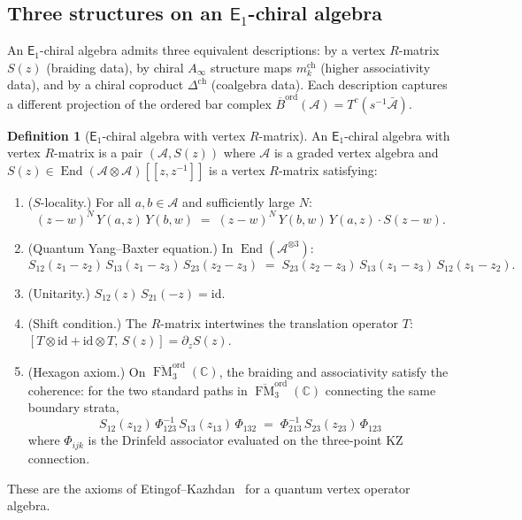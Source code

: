 \documentclass[11pt,reqno]{amsart}
\theoremstyle{definition}
\newtheorem{definition}[theorem]{Definition}
\theoremstyle{remark}
\newcommand{\cA}{\mathcal{A}}
\newcommand{\Ainf}{A_{\infty}}
\newcommand{\Eone}{\mathsf{E}_{1}}
\DeclareMathOperator{\End}{End}
\DeclareMathOperator{\FM}{FM}
\newcommand{\Barord}{\overline{B}^{\mathrm{ord}}}
\newcommand{\CC}{\mathbb{C}}
\newcommand{\id}{\mathrm{id}}
\numberwithin{equation}{section}
\begin{document}
\subsection{Three structures on an $\Eone$-chiral algebra}
\label{subsec:three-structures}

An $\Eone$-chiral algebra admits three equivalent
descriptions: by a vertex $R$-matrix $S(z)$ (braiding data),
by chiral $\Ainf$ structure maps $m_k^{\mathrm{ch}}$
(higher associativity data), and by a chiral coproduct
$\Delta^{\mathrm{ch}}$ (coalgebra data). Each description
captures a different projection of the ordered bar complex
$\Barord(\cA) = T^c(s^{-1}\bar{\cA})$.

\begin{definition}[$\Eone$-chiral algebra with vertex
$R$-matrix]
\label{def:e1-chiral-rmatrix}
An $\Eone$-chiral algebra with vertex $R$-matrix is a pair
$(\cA, S(z))$ where $\cA$ is a graded vertex algebra and
$S(z) \in \End(\cA \otimes \cA)[[z, z^{-1}]]$ is a vertex
$R$-matrix satisfying:
\begin{enumerate}[label=\textup{(\roman*)}]
\item \textup{($S$-locality.)} For all $a, b \in \cA$
  and sufficiently large $N$:
  \begin{equation}\label{eq:s-locality-sec8}
    (z - w)^N\, Y(a,z)\, Y(b,w)
    \;=\;
    (z - w)^N\, Y(b,w)\, Y(a,z) \cdot S(z - w).
  \end{equation}
\item \textup{(Quantum Yang--Baxter equation.)} In
  $\End(\cA^{\otimes 3})$:
  \begin{equation}\label{eq:qybe}
    S_{12}(z_1 - z_2)\, S_{13}(z_1 - z_3)\, S_{23}(z_2 - z_3)
    \;=\;
    S_{23}(z_2 - z_3)\, S_{13}(z_1 - z_3)\, S_{12}(z_1 - z_2).
  \end{equation}
\item \textup{(Unitarity.)}
  $S_{12}(z)\, S_{21}(-z) = \id$.
\item \textup{(Shift condition.)} The $R$-matrix
  intertwines the translation operator $T$:
  $[T \otimes \id + \id \otimes T,\, S(z)]
  = \partial_z S(z)$.
\item \textup{(Hexagon axiom.)} On
  $\overline{\FM}_3^{\mathrm{ord}}(\CC)$, the
  braiding and associativity satisfy the coherence:
  for the two standard paths in
  $\overline{\FM}_3^{\mathrm{ord}}(\CC)$ connecting the
  same boundary strata,
  \begin{equation}\label{eq:hexagon}
    S_{12}(z_{12})\, \Phi_{123}^{-1}\, S_{13}(z_{13})\, \Phi_{132}
    \;=\; \Phi_{213}^{-1}\, S_{23}(z_{23})\, \Phi_{123}
  \end{equation}
  where $\Phi_{ijk}$ is the Drinfeld associator
  evaluated on the three-point KZ connection.
\end{enumerate}
These are the axioms of Etingof--Kazhdan~\cite{EK00} for a
quantum vertex operator algebra.
\end{definition}
\end{document}
